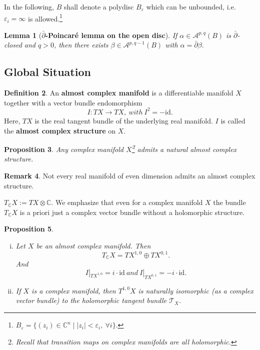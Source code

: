 \documentclass{article}
\theoremstyle{definition}
\newtheorem{definition}{Definition}[subsection]
\newtheorem{remark}[definition]{Remark}
\theoremstyle{plain}
\newtheorem{lemma}[definition]{Lemma}
\newtheorem{proposition}[definition]{Proposition}
\begin{document}
In the following, $ B $ shall denote a polydisc $ B_{\varepsilon} $ which can be unbounded, i.e. $ \varepsilon_{i}=\infty $ is allowed.\footnote{$ B_{\varepsilon}=\{(z_i)\in\mathbb{C}^n\mid |z_i|<\varepsilon_i,\ \forall i\}. $}

\begin{lemma}[\textbf{$ \bar{\partial} $-Poincar\'{e} lemma on the open disc}]\label{plm}
    If $ \alpha\in\mathcal{A}^{p,q}(B) $ is $ \bar{\partial} $-closed and $ q>0 $, then there exists $ \beta\in\mathcal{A}^{p,q-1}(B) $ with $ \alpha=\bar{\partial}\beta $.
\end{lemma}

\subsection{Global Situation}

\begin{definition}
    An \textbf{almost complex manifold} is a differentiable manifold $ X $ together with a vector bundle endomorphism\[
        I:TX\longrightarrow TX,\ with\ I^2=-\mathrm{id}.
    \]Here, $ TX $ is the real tangent bundle of the underlying real manifold. $ I $ is called the \textbf{almost complex structure} on $ X $.
\end{definition}

\begin{proposition}
    Any complex manifold $ X $\footnote{Recall that transition maps on complex manifolds are all holomorphic.} admits a natural almost complex structure.
\end{proposition}

\begin{remark}
    Not every real manifold of even dimension admits an almost complex structure.
\end{remark}

$ T_{\mathbb{C}}X:=TX\otimes\mathbb{C} $. We emphasize that even for a complex manifold $ X $ the bundle $ T_{\mathbb{C}}X $ is a priori just a complex vector bundle without a holomorphic structure.

\begin{proposition}
    \begin{enumerate}[(i)]
        \item Let $ X $ be an almost complex manifold. Then\[
            T_{\mathbb{C}}X=TX^{1,0}\oplus TX^{0,1}.
        \]And\[
            I|_{TX^{1,0}}=i\cdot\mathrm{id}\ and\ I|_{TX^{0,1}}=-i\cdot\mathrm{id}.
        \]
        \item If $ X $ is a complex manifold, then $ T^{1,0}X $ is naturally isomorphic (as a complex vector bundle) to the holomorphic tangent bundle $ \mathcal{T}_X $.
    \end{enumerate}
    
\end{proposition}
\end{document}
